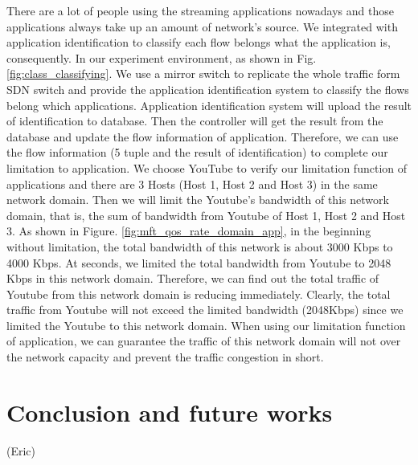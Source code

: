 \documentclass[journal]{IEEEtran}
\begin{document}
There are a lot of people using the streaming applications nowadays and those applications always take up an amount of network’s source. We integrated with application identification to classify each flow belongs what the application is, consequently.
In our experiment environment, as shown in Fig. \ref{fig:class_classifying}. We use a mirror switch to replicate the whole traffic form SDN switch and provide the application identification system to classify the flows belong which applications. Application identification system will upload the result of identification to database. Then the controller will get the result from the database and update the flow information of application. Therefore, we can use the flow information (5 tuple and the result of identification) to complete our limitation to application.
We choose YouTube to verify our limitation function of applications and there are 3 Hosts (Host 1, Host 2 and Host 3) in the same network domain. Then we will limit the Youtube’s bandwidth of this network domain, that is, the sum of bandwidth from Youtube of Host 1, Host 2 and Host 3.
As shown in Figure. \ref{fig:mft_qos_rate_domain_app}, in the beginning without limitation, the total bandwidth of this network is about 3000 Kbps to 4000 Kbps. At  seconds, we limited the total bandwidth from Youtube to 2048 Kbps in this network domain. Therefore, we can find out the total traffic of Youtube from this network domain is reducing immediately. Clearly, the total traffic from Youtube will not exceed the limited bandwidth (2048Kbps) since we limited the Youtube to this network domain.
When using our limitation function of application, we can guarantee the traffic of this network domain will not over the network capacity and prevent the traffic congestion in short.



\section{Conclusion and future works}
(Eric)



\newpage


\end{document}
